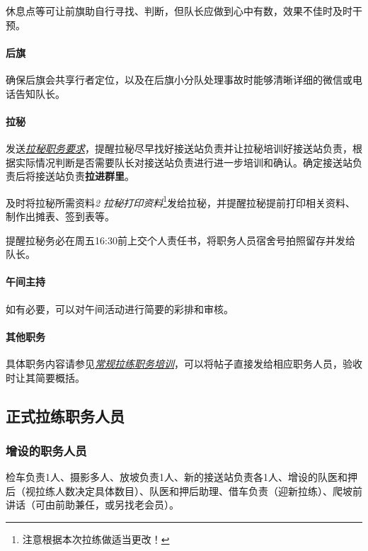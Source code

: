 \documentclass[UTF8]{ctexart}
\begin{document}
休息点等可让前旗助自行寻找、判断，但队长应做到心中有数，效果不佳时及时干预。

\paragraph{后旗}

确保后旗会共享行者定位，以及在后旗小分队处理事故时能够清晰详细的微信或电话告知队长。

\paragraph{拉秘}

发送\href{https://chexie.net/bbs/content/?bid=7&tid=1062&p=1#7}{\textit{拉秘职务要求}}，提醒拉秘尽早找好接送站负责并让拉秘培训好接送站负责，根据实际情况判断是否需要队长对接送站负责进行进一步培训和确认。确定接送站负责后将接送站负责\textbf{拉进群里}。

及时将拉秘所需资料{\color{blue}\textit{2 拉秘打印资料}}\footnote{注意根据本次拉练做适当更改！}发给拉秘，并提醒拉秘提前打印相关资料、制作出摊表、签到表等。

提醒拉秘务必在周五16:30前上交个人责任书，将职务人员宿舍号拍照留存并发给队长。

\paragraph{午间主持} 如有必要，可以对午间活动进行简要的彩排和审核。

\paragraph{其他职务}

具体职务内容请参见\href{https://chexie.net/bbs/content/?bid=7&tid=1062&p=1}{\textit{常规拉练职务培训}}，可以将帖子直接发给相应职务人员，验收时让其简要概括。

\subsection{正式拉练职务人员}

\subsubsection{增设的职务人员}

检车负责1人、摄影多人、放坡负责1人、新的接送站负责各1人、增设的队医和押后（视拉练人数决定具体数目）、队医和押后助理、借车负责（迎新拉练）、爬坡前讲话（可由前助兼任，或另找老会员）。
\end{document}
